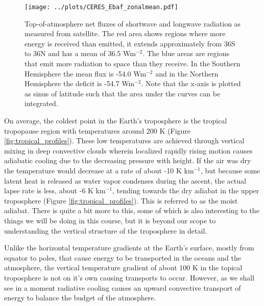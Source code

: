 \documentclass[12pt]{book}
\begin{document}
\begin{figure}
\begin{center}
\texttt{[image: ../plots/CERES\_Ebaf\_zonalmean.pdf]}
\end{center}
\caption{ Top-of-atmosphere net fluxes of shortwave and longwave radiation as measured from satellite. The red area shows regions where more energy is received than emitted, it extends approximately from 36S to 36N and has a mean of 36.5 Wm$^{-2}$. The blue areas are regions that emit more radiation to space than they receive. In the Southern Hemisphere the mean flux is -54.0 Wm$^{-2}$ and in the Northern Hemisphere the deficit is -54.7 Wm$^{-2}$. Note that the x-axis is plotted as sinus of latitude such that the area under the curves can be integrated. } 
\label{fig:ceres_fluxes}
\end{figure}

On average, the coldest point in the Earth's troposphere is the tropical tropopause region with temperatures around 200 K (Figure \ref{fig:tropical_profiles}). These low temperatures are achieved through vertical mixing in deep convective clouds wherein localized rapidly rising motion causes adiabatic cooling due to the decreasing pressure with height. If the air was dry the temperature would decrease at a rate of about -10 K km$^{-1}$, but because some latent heat is released as water vapor condenses during the ascent, the actual lapse rate is less, about -6 K km$^{-1}$, tending towards the dry adiabat in the upper troposphere (Figure \ref{fig:tropical_profiles}). This is referred to as the moist adiabat. There is quite a bit more to this, some of which is also interesting to the things we will be doing in this course, but it is beyond our scope to understanding the vertical structure of the troposphere in detail.

Unlike the horizontal temperature gradients at the Earth's surface, mostly from equator to poles, that cause energy to be transported in the oceans and the atmosphere, the vertical temperature gradient of about 100 K in the topical troposphere is not on it's own causing transports to occur. However, as we shall see in a moment radiative cooling causes an upward convective  transport of energy to balance the budget of the atmosphere.
\end{document}
